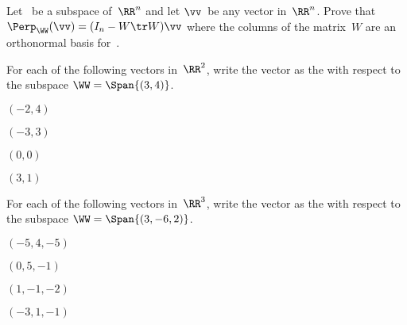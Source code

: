 \begin{exercise} \label{ex:perpn} 
Let \WW\ be a {subspace} of~\(\RR^n\) and let \(\vv\)~be any vector in~\(\RR^n\). 
Prove that \(\Perp_\WW(\vv)=(I_n-W\tr W)\vv\) where the columns of the matrix~\(W\) are an orthonormal basis for~\WW.
\end{exercise}




\begin{exercise} \label{ex:} 
For each of the following vectors in~\(\RR^2\), write the vector as the  with respect to the subspace \(\WW=\Span\{(3,4)\}\).  
\begin{parts}
\item \((-2,4)\)

\item \((-3,3)\)

\item \((0,0)\)

\item \((3,1)\)

\end{parts}
\end{exercise}




\begin{exercise} \label{ex:} 
For each of the following vectors in~\(\RR^3\), write the vector as the  with respect to the subspace \(\WW=\Span\{(3,-6,2)\}\).  
\begin{parts}
\item \((-5,4,-5)\)

\item \((0,5,-1)\)

\item \((1,-1,-2)\)

\item \((-3,1,-1)\)

\end{parts}
\end{exercise}





